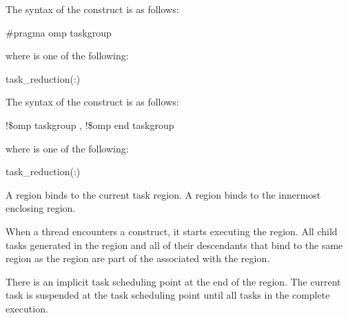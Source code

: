 \syntax
\begin{ccppspecific}
The syntax of the  construct is as follows:

\begin{boxedcode}
\#pragma omp taskgroup  
\end{boxedcode}
\end{ccppspecific}

where  is one of the following:

\begin{indentedcodelist}
task_reduction(:)
\end{indentedcodelist}

\begin{fortranspecific}
The syntax of the  construct is as follows:

\begin{boxedcode}
!\$omp taskgroup \plc{[clause [ [},\plc{] clause] ...]}
!\$omp end taskgroup
\end{boxedcode}

where  is one of the following:

\begin{indentedcodelist}
task_reduction(:)
\end{indentedcodelist}

\end{fortranspecific}

\binding
A  region binds to the current task region. A  region binds to 
the innermost enclosing  region. 

\descr
When a thread encounters a  construct, it starts executing 
the region. All child tasks generated in the  region and all 
of their descendants that bind to the same  region as the 
 region are part of the  associated with 
the  region.

There is an implicit task scheduling point at the end of the  
region. The current task is suspended at the task scheduling point until all 
tasks in the  complete execution.


